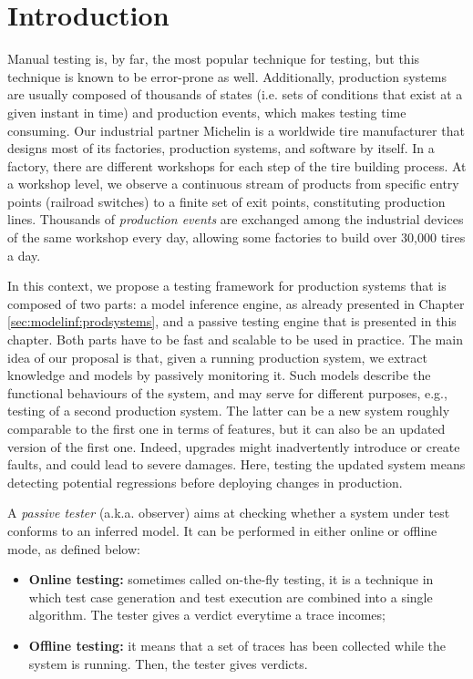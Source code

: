 \section{Introduction}
\label{sec:testing:intro}

Manual testing is, by far, the most popular technique for
testing, but this technique is known to be error-prone as well.
Additionally, production systems are usually composed of
thousands of states (i.e. sets of conditions that exist at a
given instant in time) and production events, which makes
testing time consuming. Our industrial partner Michelin is a
worldwide tire manufacturer that designs most of its factories,
production systems, and software by itself. In a factory, there
are different workshops for each step of the tire building
process. At a workshop level, we observe a continuous stream of
products from specific entry points (railroad switches) to a
finite set of exit points, constituting production lines.
Thousands of \emph{production events} are exchanged among the
industrial devices of the same workshop every day, allowing some
factories to build over 30,000 tires a day.

In this context, we propose a testing framework for production
systems that is composed of two parts: a model inference engine,
as already presented in Chapter \ref{sec:modelinf:prodsystems},
and a passive testing engine that is presented in this chapter.
Both parts have to be fast and scalable to be used in practice.
The main idea of our proposal is that, given a running production
system, we extract knowledge and models by passively monitoring
it. Such models describe the functional behaviours of the system,
and may serve for different purposes, e.g., testing of a second
production system. The latter can be a new system roughly
comparable to the first one in terms of features, but it can also
be an updated version of the first one. Indeed, upgrades might
inadvertently introduce or create faults, and could lead to
severe damages. Here, testing the updated system means detecting
potential regressions before deploying changes in production.

A \textit{passive tester} (a.k.a. observer) aims at checking
whether a system under test conforms to an inferred model. It can
be performed in either online or offline mode, as defined below:

\begin{itemize}
    \item \textbf{Online testing:} sometimes called on-the-fly
        testing, it is a technique in which test case generation
        and test execution are combined into a single algorithm.
        The tester gives a verdict everytime a trace incomes;

    \item \textbf{Offline testing:} it means that a set of traces
        has been collected while the system is running. Then, the
        tester gives verdicts.
\end{itemize}

